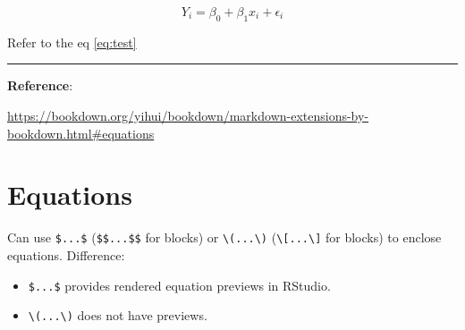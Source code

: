 \documentclass[
]{book}
\newenvironment{Shaded}{\begin{snugshade}}{\end{snugshade}}
\newcommand{\ExtensionTok}[1]{#1}
\newcommand{\KeywordTok}[1]{\textcolor[rgb]{0.13,0.29,0.53}{\textbf{#1}}}
\newcommand{\NormalTok}[1]{#1}
\newcommand{\SpecialCharTok}[1]{\textcolor[rgb]{0.81,0.36,0.00}{\textbf{#1}}}
\newcommand{\SpecialStringTok}[1]{\textcolor[rgb]{0.31,0.60,0.02}{#1}}
\providecommand{\tightlist}{%
  \setlength{\itemsep}{0pt}\setlength{\parskip}{0pt}}
\theoremstyle{definition}
\theoremstyle{definition}
\theoremstyle{definition}
\theoremstyle{definition}
\theoremstyle{remark}
\begin{document}
\begin{enumerate}
\begin{Shaded}
\end{Shaded}

  \begin{equation} \label{eq:test} \tag{my label}
  Y_i = \beta_0 + \beta_1 x_i + \epsilon_i
  \end{equation}

  Refer to the eq \eqref{eq:test}
\end{enumerate}

\begin{center}\rule{0.5\linewidth}{0.5pt}\end{center}

\textbf{Reference}:

\url{https://bookdown.org/yihui/bookdown/markdown-extensions-by-bookdown.html\#equations}

\section{Equations}\label{equations}

Can use \texttt{\$...\$} (\texttt{\$\$...\$\$} for blocks) or \texttt{\textbackslash{}(...\textbackslash{})} (\texttt{\textbackslash{}{[}...\textbackslash{}{]}} for blocks) to enclose equations. Difference:

\begin{itemize}
\tightlist
\item
  \texttt{\$...\$} provides rendered equation previews in RStudio.
\item
  \texttt{\textbackslash{}(...\textbackslash{})} does not have previews.
\end{itemize}
\end{document}
